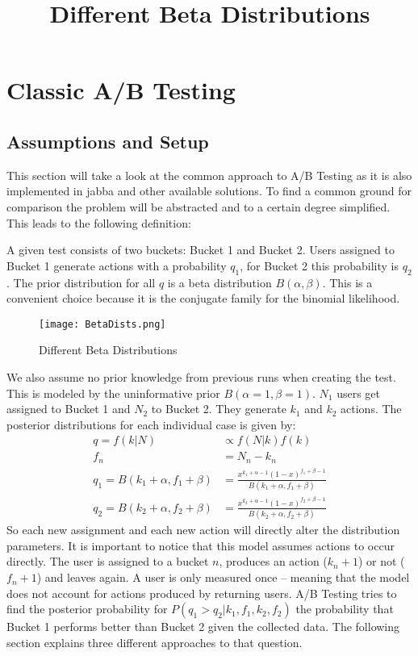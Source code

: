 \documentclass[../Thesis.tex]{subfiles}
\begin{document}
\chapter{Classic A/B Testing}

\section{Assumptions and Setup}\label{sec:setup}
This section will take a look at the common approach to A/B Testing as it is also implemented in jabba and other available solutions. To find a common ground for comparison the problem will be abstracted and to a certain degree simplified. This leads to the following definition:

A given test consists of two buckets: Bucket 1 and Bucket 2. Users assigned to Bucket 1 generate actions with a probability $q_1$, for Bucket 2 this probability is $q_2$. The prior distribution for all $q$ is a beta distribution $B(\alpha,\beta)$. This is a convenient choice because it is the conjugate family for the binomial likelihood. 

\begin{figure}[h]
\texttt{[image: BetaDists.png]}
\centering
\title{Different Beta Distributions}
\caption{Different Beta Distributions}
\end{figure}

We also assume no prior knowledge from previous runs when creating the test. This is modeled by the uninformative prior $B(\alpha=1,\beta=1)$. $N_1$ users get assigned to Bucket 1 and $N_2$ to Bucket 2. They generate $k_1$ and $k_2$ actions. The posterior distributions for each individual case is given by:
\begin{align*}
q = f(k|N) &\propto f(N|k)f(k)\\
f_n &= N_n-k_n \\
q_1 = B(k_1+\alpha,f_1+\beta) & = \frac{x^{k_1+\alpha-1}(1-x)^{f_1+\beta -1}}{B(k_1+\alpha,f_1+\beta)} \\
q_2 = B(k_2+\alpha,f_2+\beta) & = \frac{x^{k_2+\alpha-1}(1-x)^{f_2+\beta -1}}{B(k_2+\alpha,f_2+\beta)}
\end{align*}
So each new assignment and each new action will directly alter the distribution parameters. It is important to notice that this model assumes actions to occur directly. The user is assigned to a bucket $n$, produces an action ($k_n + 1$) or not ($f_n + 1$) and leaves again. A user is only measured once -- meaning that the model does not account for actions produced by returning users.
A/B Testing tries to find the posterior probability for $P(q_1>q_2 | k_1,f_1,k_2,f_2)$ the probability that Bucket 1 performs better than Bucket 2 given the collected data. The following section explains three different approaches to that question.
\end{document}
